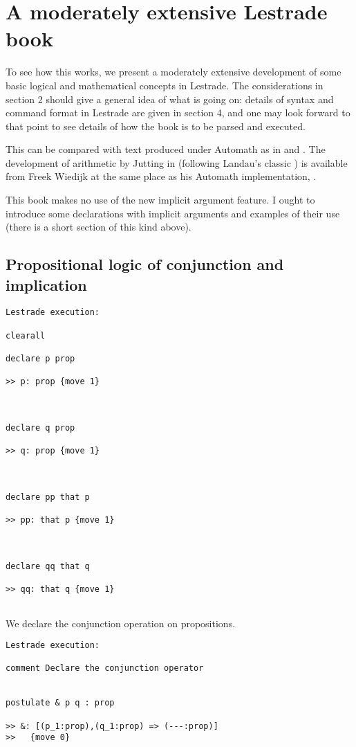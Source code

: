 \documentclass[12pt]{article}
\begin{document}
\newpage



\section{A moderately extensive Lestrade book}

To see how this works, we present a moderately extensive development of some basic logical and mathematical concepts in Lestrade.  The considerations in section 2 should give a general idea of what is going on:  details of syntax and command format in Lestrade are given in section 4, and one may look forward to that point to see details of how the book is to be parsed and executed.

This can be compared with text produced under Automath as in \cite{automathtext} and \cite{grundlagen}.  The development of arithmetic by Jutting in \cite{grundlagen} (following Landau's classic \cite{landau}) is available from Freek Wiedijk at the same place as his Automath implementation, \cite{freek}.

This book makes no use of the new implicit argument feature.  I ought to introduce some declarations with implicit arguments and examples of their use (there is a short section of this kind above).

\subsection{Propositional logic of conjunction and implication}

\begin{verbatim}Lestrade execution:

clearall

declare p prop

>> p: prop {move 1}



declare q prop

>> q: prop {move 1}



declare pp that p

>> pp: that p {move 1}



declare qq that q

>> qq: that q {move 1}


\end{verbatim}

We declare the conjunction operation on propositions.

\begin{verbatim}Lestrade execution:

comment Declare the conjunction operator


postulate & p q : prop

>> &: [(p_1:prop),(q_1:prop) => (---:prop)]
>>   {move 0}


\end{verbatim}
\end{document}
